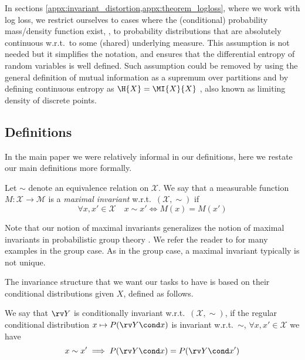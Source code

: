 \documentclass[final]{article}
\begin{document}
\begin{assumption}\label{assumption:density} 
In sections \cref{appx:invariant_distortion,appx:theorem_logloss}, where we work with log loss, we restrict ourselves to cases where the (conditional) probability mass/density function exist, \ie, to probability distributions that are absolutely continuous w.r.t.\ to some (shared) underlying measure.
This assumption is not needed but it simplifies the notation, and ensures that the differential entropy of random variables is well defined.
Such assumption could be removed by using the general definition of mutual information as a supremum over partitions and by defining continuous entropy as $\H{X} = \MI{X}{X}$ \cite{kolmogorov_shannon_1956,pinsker_information_1964}, also known as  limiting density of discrete points.
\end{assumption}

\subsection{Definitions}
\label{appx:definitions}

In the main paper we were relatively informal in our definitions, here we restate our main definitions more formally.



\begin{definition}\label{def:maximal_invariant}
Let $\sim$ denote an equivalence relation on $\mathcal{X}$.
We say that a measurable function $M: \mathcal{X} \to \mathcal{M}$ is a \textit{maximal invariant} w.r.t.\  $(\mathcal{X}, \sim)$ if
\begin{equation}\label{eq:max_inv}
\forall x,x' \in \mathcal{X} \quad  x \sim x' \iff M(x) = M(x')
\end{equation}
\end{definition}

Note that our notion of maximal invariants generalizes the notion of maximal invariants in probabilistic group theory \cite{eaton_group_1989}. 
We refer the reader to \citet{lehmann_testing_2005} for many examples in the group case. As in the group case, a maximal invariant typically is not unique. 


The invariance structure that we want our tasks to have is based on their conditional distributions given $X$, defined as follows.

\begin{definition}\label{def:cond_invariance}
We say that $\rv Y$ is conditionally invariant w.r.t.\  $(\mathcal X, \sim)$, if the regular conditional distribution $x \mapsto P(\rv Y \cond x)$ is invariant w.r.t.\ $\sim$, \ie $\forall x, x' \in \mathcal{X}$ we have 
\begin{equation}\label{appx:eqn:task_invariance}
x \sim x' \implies P(\rv Y \cond x) = P(\rv Y \cond x')
\end{equation}
\end{definition}
\end{document}
